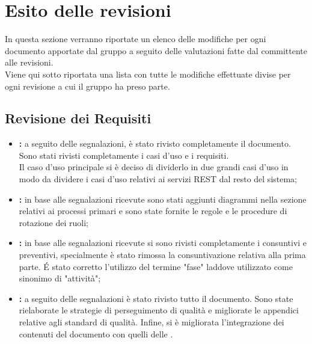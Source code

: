 %



\section{Esito delle revisioni}
In questa sezione verranno riportate un elenco delle modifiche per ogni documento apportate dal gruppo a seguito delle valutazioni fatte dal committente alle revisioni.\\
Viene qui sotto riportata una lista con tutte le modifiche effettuate divise per ogni revisione a cui il gruppo ha preso parte.

	\subsection{Revisione dei Requisiti}
	\begin{itemize}
		\item \textbf{\docNameAdR:} a seguito delle segnalazioni, è stato rivisto completamente il documento. Sono stati rivisti completamente i casi d'uso e i requisiti.\\
		Il caso d'uso principale si è deciso di dividerlo in due grandi casi d'uso in modo da dividere i casi d'uso relativi ai servizi REST dal resto del sistema;
		\item \textbf{\docNameNdP:} in base alle segnalazioni ricevute sono stati aggiunti diagrammi nella sezione relativi ai processi primari e sono state fornite le regole e le procedure di rotazione dei ruoli;
		\item \textbf{\docNamePdP:} in base alle segnalazioni ricevute si sono rivisti completamente i consuntivi e preventivi, specialmente è stato rimossa la consuntivazione relativa alla prima parte. É stato corretto l'utilizzo del termine "fase" laddove utilizzato come sinonimo di "attività";
		\item \textbf{\docNamePdQ:} a seguito delle segnalazioni è stato rivisto tutto il documento. Sono state rielaborate le strategie di perseguimento di qualità e migliorate le appendici relative agli standard di qualità. Infine, si è migliorata l'integrazione dei contenuti del documento con quelli delle \docNameNdP.
	\end{itemize}

\pagebreak
